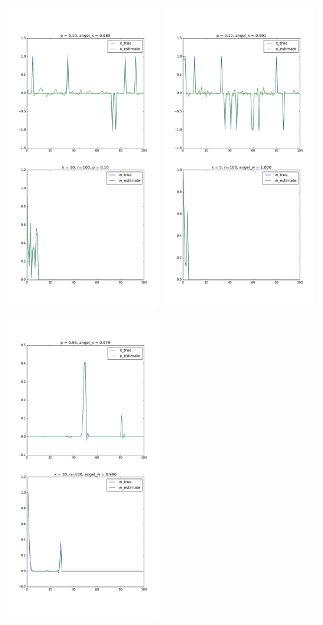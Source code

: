 \documentclass[letter, 10pt]{article}
\numberwithin{equation}{section}
\begin{document}
\begin{figure}
\includegraphics[width=4cm,keepaspectratio]{fig/02_Series_x_Binary_w_Normal_noA_n100_k20_p0_10_sigma0_00.png}
\includegraphics[width=4cm,keepaspectratio]{fig/Collect_Series_x_Binary_w_Gaus_noA_n100_k5_p0_12_sigma0_00.png}
\includegraphics[width=4cm,keepaspectratio]{fig/Collect_Series_x_Gauss_w_Norm_noA_n100_k30_p0_95_sigma0_00.png}

\end{figure}
\end{document}
